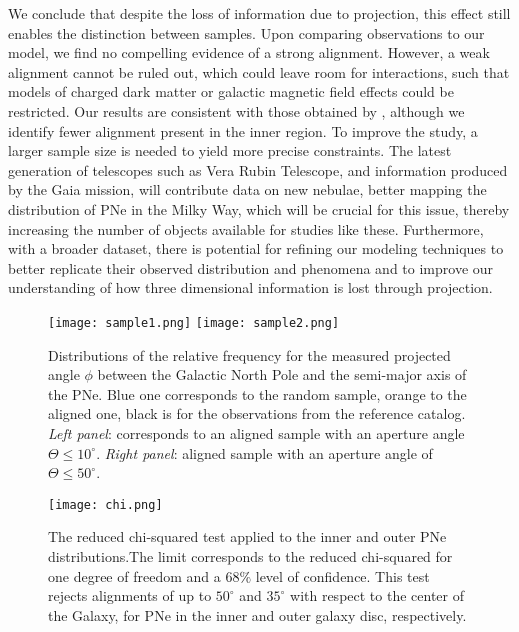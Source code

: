 \documentclass[baaa]{baaa}
\begin{document}
We conclude that despite the loss of information due to projection, this effect still enables the distinction between samples. Upon comparing observations to our model, we find no compelling evidence of a strong alignment. However, a weak alignment cannot be ruled out, which could leave room for interactions, such that models of charged dark matter or galactic magnetic field effects could be restricted. Our results are consistent with those obtained by \cite{2008PASP..120..380W}, although we identify fewer alignment present in the inner region. To improve the study, a larger sample size is needed to yield more precise constraints. The latest generation of telescopes such as Vera Rubin Telescope, and information
produced by the Gaia mission, will contribute data on new nebulae, better mapping the distribution
of PNe in the Milky Way, which will be crucial for this issue, thereby increasing the number of
objects available for studies like these. Furthermore, with a broader dataset, there is potential for refining our modeling techniques to better replicate their observed distribution and phenomena and to improve our understanding of how three dimensional information is lost through projection.

\begin{figure*}[!h]
\centering
\texttt{[image: sample1.png]}
\texttt{[image: sample2.png]}
\caption{Distributions of the relative frequency for the measured projected angle $\phi$ between the Galactic North Pole and the semi-major axis of the PNe. Blue one corresponds to the random sample, orange to the aligned one, black is for the observations from the reference catalog.  \textit{Left panel}: corresponds to an aligned sample with an aperture angle $\Theta \leq10^\circ $. \textit{Right panel}: aligned sample with an aperture angle of $\Theta \leq 50^\circ $.}
\label{Figure 1}
\end{figure*}


\begin{figure}[!h]
\centering
\texttt{[image: chi.png]}
\caption{The reduced chi-squared test applied to the inner and outer PNe distributions.The limit corresponds to the reduced chi-squared for one degree of freedom and a $68\%$ level of confidence. This test rejects alignments of up to $50^\circ$ and $35^\circ$ with respect to the center of the Galaxy, for PNe in the inner and outer galaxy disc, respectively.
}
\label{Figure 2}
\end{figure}
\end{document}
